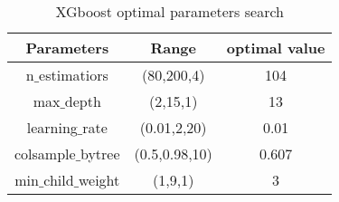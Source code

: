 \documentclass{article}
\begin{document}
	
	\begin{table}[htb]
		\centering
		\caption{XGboost optimal parameters search}
		\label{table1}
		\begin{tabular}{|c|c|c|}
			\hline
			{Parameters} & {Range} & {optimal value}\\
			\hline
			{ n$\_$estimatiors} & {(80,200,4)} & {104} \\
			\hline
			{ max$\_$depth } & {(2,15,1)} & {13} \\
			\hline
			{  learning$\_$rate  } & {(0.01,2,20)} & {0.01} \\
			\hline
			{  colsample$\_$bytree} & {(0.5,0.98,10)} &  { 0.607 } \\
			\hline
			{  min$\_$child$\_$weight  } & {(1,9,1)} & {3} \\
			\hline
		\end{tabular}
		\label{performance of each algorithm}
	\end{table}
	
\end{document}
